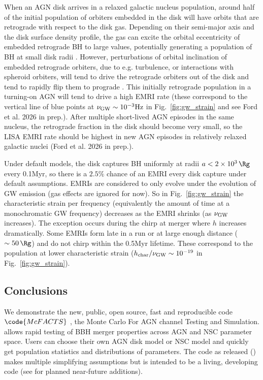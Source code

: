 When an AGN disk arrives in a relaxed galactic nucleus population, around half of the initial population of orbiters embedded in the disk will have orbits that are retrograde with respect to the disk gas. Depending on their semi-major axis and the disk surface density profile, the gas can excite the orbital eccentricity of embedded retrograde BH to large values, potentially generating a population of BH at small disk radii \citep{Secunda+21}. However, perturbations of orbital inclination of embedded retrograde orbiters, due to e.g. turbulence, or interactions with spheroid orbiters, will tend to drive the retrograde orbiters out of the disk and tend to rapidly flip them to prograde \citep{WangZhuLin24}. This initially retrograde population in a turning-on AGN will tend to drive a high EMRI rate (these correspond to the vertical line of blue points at $\nu_{\rm GW} \sim 10^{-3}{\rm Hz}$ in Fig.~\ref{fig:gw_strain} and see {Ford et al. 2026 in prep.}). After multiple short-lived AGN episodes in the same nucleus, the retrograde fraction in the disk should become very small, so the LISA EMRI rate should be highest in new AGN episodes in relatively relaxed galactic nuclei (Ford et al. 2026 in prep.).

Under default models, the disk captures BH uniformly at radii $a<2\times 10^{3}\,\Rg$ every 0.1Myr, so there is a $2.5\%$ chance of an EMRI every disk capture under default assumptions. EMRIs are considered to only evolve under the evolution of GW emission (gas effects are ignored for now). So in Fig.~\ref{fig:gw_strain} the characteristic strain per frequency (equivalently the amount of time at a monochromatic 
 GW frequency) decreases as the EMRI shrinks (as $\nu_{\rm GW}$ increases). The exception occurs during the chirp at merger where $h$ increases dramatically. Some EMRIs form late in a run or at large enough distance ($\sim 50\,\Rg$) and do not chirp within the 0.5Myr lifetime. These correspond to the population at lower characteristic strain ($h_{\rm char}/\nu_{\rm GW} \sim 10^{-19}$ in Fig.~\ref{fig:gw_strain}).
 
\subsection{Conclusions}
\label{sec:mcfacts-conclusions}

We demonstrate the new, public, open source, fast and reproducible code $\code{McFACTS}$ , the Monte Carlo For AGN channel Testing and Simulation.  allows rapid testing of BBH merger properties across AGN and NSC parameter space. Users can choose their own AGN disk model or NSC model and quickly get population statistics and distributions of parameters. The code as released () makes multiple simplifying assumptions but is intended to be a living, developing code (see  for planned near-future additions).

